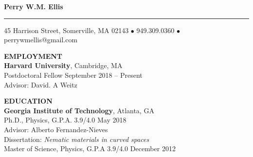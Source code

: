 \documentclass[10pt]{article}
\newcommand{\HRule}{\rule{\linewidth}{0.5mm}}
\newenvironment{changemargin}[2]{%
  \list{}{\rightmargin#2\leftmargin#1
    \parsep=0pt\topsep=1pt\partopsep=0pt}
\item[]} {\endlist}
\newenvironment{indentmore}{\begin{changemargin}{10pt}{0cm}}{\end{changemargin}}
\begin{document}
\begin{center}

\textbf{\Large Perry W.M. Ellis}
\HRule

45 Harrison Street, Somerville, MA 02143 $\bullet$ 949.309.0360 $\bullet$ perrywmellis@gmail.com

\end{center}

\vspace{10pt}
\textbf{\large EMPLOYMENT} \\
\textbf{Harvard University}, Cambridge, MA\\
\hspace*{10pt}Postdoctoral Fellow \hfill September 2018 -- Present\\
\hspace*{10pt}Advisor: David. A Weitz
\vspace{10pt}

\textbf{\large EDUCATION} \\
\textbf{Georgia Institute of Technology}, Atlanta, GA\\
\hspace*{10pt}Ph.D., Physics, G.P.A. 3.9/4.0 \hfill May 2018\\
\hspace*{10pt}Advisor: Alberto Fernandez-Nieves\\
\hspace*{10pt}Dissertation: \emph{Nematic materials in curved spaces}\\

\hspace*{10pt}Master of Science, Physics, G.P.A 3.9/4.0 \hfill December 2012

\vspace{10pt}
\end{document}
